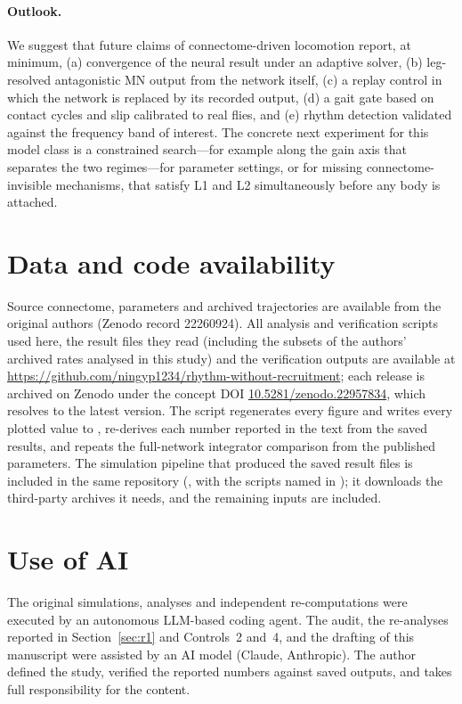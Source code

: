\documentclass[11pt]{article}
\begin{document}
\paragraph{Outlook.} We suggest that future claims of connectome-driven locomotion report, at minimum, (a) convergence of the neural result under an adaptive solver, (b) leg-resolved antagonistic MN output from the network itself, (c) a replay control in which the network is replaced by its recorded output, (d) a gait gate based on contact cycles and slip calibrated to real flies, and (e) rhythm detection validated against the frequency band of interest. The concrete next experiment for this model class is a constrained search---for example along the gain axis that separates the two regimes---for parameter settings, or for missing connectome-invisible mechanisms, that satisfy L1 and L2 simultaneously before any body is attached.

\section*{Data and code availability}
Source connectome, parameters and archived trajectories are available from the original authors \citep{pugliese2026} (Zenodo record 22260924). All analysis and verification scripts used here, the result files they read (including the subsets of the authors' archived rates analysed in this study) and the verification outputs are available at \url{https://github.com/ningyp1234/rhythm-without-recruitment}; each release is archived on Zenodo under the concept DOI \href{https://doi.org/10.5281/zenodo.22957834}{10.5281/zenodo.22957834}, which resolves to the latest version. The script  regenerates every figure and writes every plotted value to ,  re-derives each number reported in the text from the saved results, and  repeats the full-network integrator comparison from the published parameters. The simulation pipeline that produced the saved result files is included in the same repository (, with the scripts named in ); it downloads the third-party archives it needs, and the remaining inputs are included.

\section*{Use of AI}
The original simulations, analyses and independent re-computations were executed by an autonomous LLM-based coding agent. The audit, the re-analyses reported in Section~\ref{sec:r1} and Controls~2 and~4, and the drafting of this manuscript were assisted by an AI model (Claude, Anthropic). The author defined the study, verified the reported numbers against saved outputs, and takes full responsibility for the content.
\end{document}
